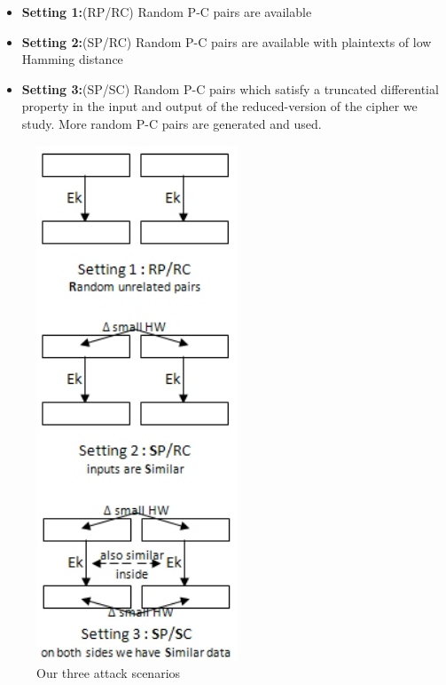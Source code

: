 \begin{itemize}
	\item \textbf{Setting 1:}(RP/RC) Random P-C pairs are available
	\item \textbf{Setting 2:}(SP/RC) Random P-C pairs are available with plaintexts of low Hamming distance
	\item \textbf{Setting 3:}(SP/SC) Random P-C pairs which satisfy a truncated differential property in the input and output of the reduced-version of the cipher we study. More random P-C pairs are generated and used.
\end{itemize}

\begin{figure}[!h]
	\vspace{-0.2cm}
	\centering
	\includegraphics*[width=60mm]{./pics/three_scenarios2.jpg}
	\caption{Our three attack scenarios}
	\label{ThreeScenarios}
	\vspace{-0.1cm}
\end{figure}



